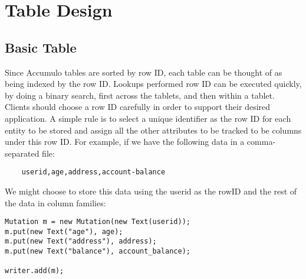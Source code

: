 
%
%

\chapter{Table Design}

\section{Basic Table}

Since Accumulo tables are sorted by row ID, each table can be thought of as being
indexed by the row ID. Lookups performed row ID can be executed quickly, by doing
a binary search, first across the tablets, and then within a tablet. Clients should
choose a row ID carefully in order to support their desired application. A simple rule
is to select a unique identifier as the row ID for each entity to be stored and assign
all the other attributes to be tracked to be columns under this row ID. For example,
if we have the following data in a comma-separated file:

\small
\begin{verbatim}
    userid,age,address,account-balance
\end{verbatim}
\normalsize

We might choose to store this data using the userid as the rowID and the rest of the
data in column families:

\small
\begin{verbatim}
Mutation m = new Mutation(new Text(userid));
m.put(new Text("age"), age);
m.put(new Text("address"), address);
m.put(new Text("balance"), account_balance);

writer.add(m);
\end{verbatim}
\normalsize

